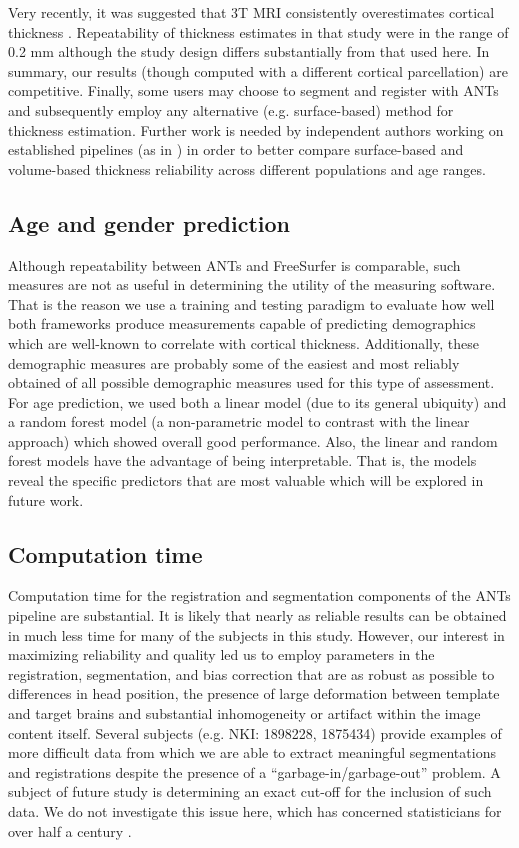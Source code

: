Very recently, it was suggested that 3T MRI
consistently overestimates cortical thickness \cite{lusebrink2013}.
Repeatability of thickness estimates in that study were in the range
of 0.2 mm although the study design differs substantially from that used here.
In summary, our results (though computed
with a different cortical parcellation) are competitive.  
Finally, some users may choose to segment and register
with ANTs and subsequently employ any alternative (e.g. surface-based)
method for thickness estimation.  Further work is needed by
independent authors working on established pipelines (as in \cite{lusebrink2013,jovicich2013}) in order to
better compare surface-based and volume-based thickness reliability
across different populations and age ranges. 

\subsection{Age and gender prediction} 
Although repeatability between ANTs and FreeSurfer is comparable,
such measures are not as useful in determining the utility of the 
measuring software.  That is the reason we use a training and testing 
paradigm to evaluate how well both frameworks produce measurements 
capable of predicting demographics which are well-known to correlate
with cortical thickness.  Additionally, these demographic measures are
probably some of the easiest and most reliably obtained of all possible
demographic measures used for this type of assessment.  For age prediction,
we used both a linear model (due to its general ubiquity) and a random
forest model (a non-parametric model to contrast with the linear approach)
which showed overall good performance.  Also, the linear  and
random forest models have the advantage of being
interpretable.  That is, the models reveal the specific predictors
that are most valuable which will be explored in future work.  

\subsection{Computation time}
Computation time for the registration and segmentation components of
the ANTs pipeline are substantial.  It is likely that nearly as reliable
results can be obtained in much less time for many of the subjects in
this study.  However, our interest in
maximizing reliability and quality led us to employ parameters in the
registration, segmentation, and bias correction that are as robust as
possible to differences in head position, the presence of large
deformation between template and target brains and substantial
inhomogeneity or artifact within the image content itself.  Several
subjects (e.g. NKI: 1898228, 1875434) provide examples of more difficult 
data from which we are able to
extract meaningful segmentations and registrations despite the presence of a
``garbage-in/garbage-out'' problem.  A subject of future study is
determining an exact cut-off for the inclusion of such data.  We do not
investigate this issue here, which has concerned statisticians for over
half a century \cite{Hampel2001}. 


